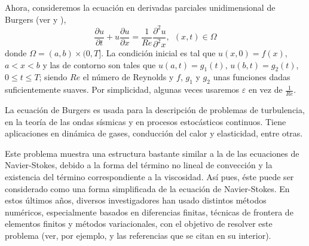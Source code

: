 Ahora, consideremos la ecuación en derivadas parciales unidimensional de Burgers (ver \cite{Bateman} y \cite{Burgers}),
\begin{equation}\label{BE}
\frac{\partial u}{\partial t}+u \frac{\partial u}{\partial
	x}=\frac{1}{Re} \frac{\partial^2 u}{\partial^2 x}, \ \ (x,t)\in
\Omega
\end{equation}
donde $\Omega=(a,b)\times(0,T]$. La condición inicial es tal que $u(x,0)=f(x)$, $a<x<b$ y las de contorno son tales que $u(a,t)=g_1(t)$,
$u(b,t)=g_2(t)$, $0\leq t \leq T$; siendo $Re$ el número de Reynolds 
y $f$, $g_1$ y $g_2$ unas funciones dadas suficientemente suaves. Por simplicidad, algunas veces usaremos $\varepsilon$ en vez de $\frac{1}{Re}$.

La ecuación de Burgers es usada para la descripción de problemas de turbulencia, en la teoría de las ondas sísmicas y en procesos estocásticos continuos. Tiene aplicaciones en dinámica de gases, conducción del calor y elasticidad, entre otras.

Este problema muestra una estructura bastante similar a la de las ecuaciones de Navier-Stokes, debido a la forma del término no lineal de convección y la existencia del término correspondiente a la viscosidad. Así pues, éste puede ser considerado como una forma simplificada de la ecuación de Navier-Stokes. En estos últimos años, diversos investigadores han usado distintos métodos numéricos, especialmente basados en diferencias finitas, técnicas de frontera de elementos finitos y métodos variacionales, con el objetivo de resolver este problema (ver, por ejemplo, \cite{KA,HSH,WT} y las referencias que se citan en su interior).

